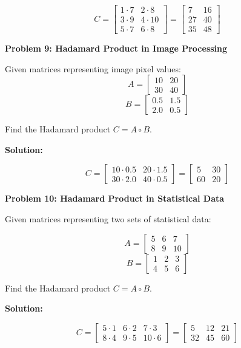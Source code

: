 \documentclass[
  letterpaper,
  DIV=11,
  numbers=noendperiod]{scrreprt}
\theoremstyle{plain}
\theoremstyle{definition}
\theoremstyle{remark}
\begin{document}
\[C=\begin{bmatrix}
1\cdot7&2\cdot8\\
3\cdot9&4\cdot10\\
5\cdot7&6\cdot8
\end{bmatrix}=
\begin{bmatrix}
7&16\\
27&40\\
35&48
\end{bmatrix}\]

\textbf{Problem 9: Hadamard Product in Image Processing}

Given matrices representing image pixel values:
\[A=\begin{bmatrix}10&20\\30&40\end{bmatrix}\]
\[B=\begin{bmatrix}0.5&1.5\\2.0&0.5\end{bmatrix}\]

Find the Hadamard product \(C=A\circ B\).

\textbf{Solution:}

\[C=\begin{bmatrix}
10\cdot0.5&20\cdot1.5\\
30\cdot2.0&40\cdot0.5
\end{bmatrix}=
\begin{bmatrix}
5&30\\
60&20
\end{bmatrix}\]

\textbf{Problem 10: Hadamard Product in Statistical Data}

Given matrices representing two sets of statistical data:

\[A=\begin{bmatrix}5&6&7\\8&9&10\end{bmatrix}\]
\[B=\begin{bmatrix}1&2&3\\4&5&6\end{bmatrix}\]

Find the Hadamard product \(C=A\circ B\).

\textbf{Solution:}

\[C=\begin{bmatrix}
5\cdot1&6\cdot2&7\cdot3\\
8\cdot4&9\cdot5&10\cdot6
\end{bmatrix}=
\begin{bmatrix}
5&12&21\\
32&45&60
\end{bmatrix}\]
\end{document}
